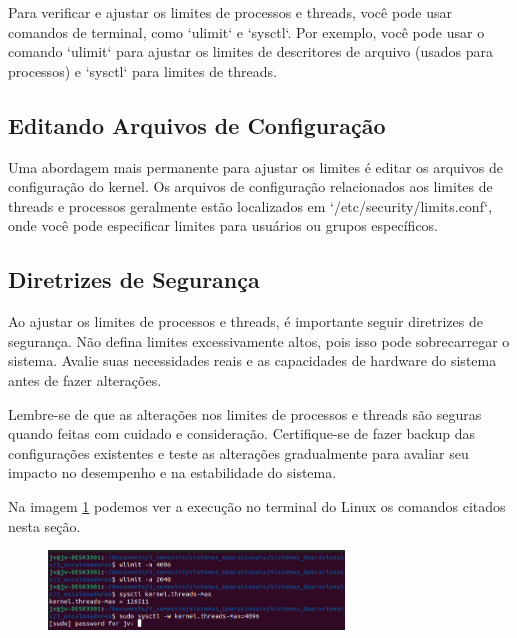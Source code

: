 \documentclass[
	12pt,				%
	openright,			%
	oneside,			%
	a4paper,			%
	chapter=TITLE,		%
	english,			%
	french,				%
	spanish,			%
	brazil				%
	]{abntex2}
\theoremstyle{definition}
\begin{document}
Para verificar e ajustar os limites de processos e threads, você pode usar comandos de terminal, como `ulimit` e `sysctl`. Por exemplo, você pode usar o comando `ulimit` para ajustar os limites de descritores de arquivo (usados para processos) e `sysctl` para limites de threads.

\subsection{Editando Arquivos de Configuração}

Uma abordagem mais permanente para ajustar os limites é editar os arquivos de configuração do kernel. Os arquivos de configuração relacionados aos limites de threads e processos geralmente estão localizados em `/etc/security/limits.conf`, onde você pode especificar limites para usuários ou grupos específicos.

\subsection{Diretrizes de Segurança}

Ao ajustar os limites de processos e threads, é importante seguir diretrizes de segurança. Não defina limites excessivamente altos, pois isso pode sobrecarregar o sistema. Avalie suas necessidades reais e as capacidades de hardware do sistema antes de fazer alterações.

Lembre-se de que as alterações nos limites de processos e threads são seguras quando feitas com cuidado e consideração. Certifique-se de fazer backup das configurações existentes e teste as alterações gradualmente para avaliar seu impacto no desempenho e na estabilidade do sistema.

Na imagem \ref{fig:run7} podemos ver a execução no terminal do Linux os comandos citados nesta seção.

\begin{figure}
    \centering
    \includegraphics[width=0.7\textwidth]{imagens/limites_max.png}
    \caption{}
    \label{fig:run7}
\end{figure}

\end{document}
